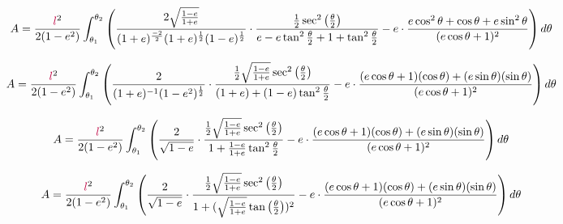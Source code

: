 $$A=\frac{\textcolor{purple}{l}^2}{2(1-\textcolor{black}{e}^2)}\int_{\theta_1}^{\theta_2}\left(
\frac{2\sqrt{\frac{1-\textcolor{black}{e}}{1+\textcolor{black}{e}}}}{(1+\textcolor{black}{e})^{\frac{-2}{2}}(1+\textcolor{black}{e})^{\frac{1}{2}}(1-\textcolor{black}{e})^{\frac{1}{2}}}\cdot
\frac{\frac{1}{2}\sec^2{\left(\frac{\theta}{2}\right)}}{\textcolor{black}{e}-\textcolor{black}{e}\tan^2{\frac{\theta}{2}}+1+\tan^2{\frac{\theta}{2}}}
-\textcolor{black}{e}\cdot\frac{\textcolor{black}{e}\cos^2{\theta}+\cos{\theta}+\textcolor{black}{e}\sin^2{\theta}}{(\textcolor{black}{e}\cos{\theta}+1)^2}\right)d\theta$$

$$A=\frac{\textcolor{purple}{l}^2}{2(1-\textcolor{black}{e}^2)}\int_{\theta_1}^{\theta_2}\left(
\frac{2}{(1+\textcolor{black}{e})^{-1}(1-\textcolor{black}{e}^2)^{\frac{1}{2}}}\cdot
\frac{\frac{1}{2}\sqrt{\frac{1-\textcolor{black}{e}}{1+\textcolor{black}{e}}}\sec^2{\left(\frac{\theta}{2}\right)}}{(1+\textcolor{black}{e})+(1-\textcolor{black}{e})\tan^2{\frac{\theta}{2}}}
-\textcolor{black}{e}\cdot\frac{(\textcolor{black}{e}\cos{\theta}+1)(\cos{\theta})+(\textcolor{black}{e}\sin{\theta})(\sin{\theta})}{(\textcolor{black}{e}\cos{\theta}+1)^2}\right)d\theta$$

$$A=\frac{\textcolor{purple}{l}^2}{2(1-\textcolor{black}{e}^2)}\int_{\theta_1}^{\theta_2}\left(
\frac{2}{\sqrt{1-\textcolor{black}{e}}}\cdot
\frac{\frac{1}{2}\sqrt{\frac{1-\textcolor{black}{e}}{1+\textcolor{black}{e}}}\sec^2{\left(\frac{\theta}{2}\right)}}{1+\frac{1-\textcolor{black}{e}}{1+\textcolor{black}{e}}\tan^2{\frac{\theta}{2}}}
-\textcolor{black}{e}\cdot\frac{(\textcolor{black}{e}\cos{\theta}+1)(\cos{\theta})+(\textcolor{black}{e}\sin{\theta})(\sin{\theta})}{(\textcolor{black}{e}\cos{\theta}+1)^2}\right)d\theta$$

$$A=\frac{\textcolor{purple}{l}^2}{2(1-\textcolor{black}{e}^2)}\int_{\theta_1}^{\theta_2}\left(
\frac{2}{\sqrt{1-\textcolor{black}{e}}}\cdot
\frac{\frac{1}{2}\sqrt{\frac{1-\textcolor{black}{e}}{1+\textcolor{black}{e}}}\sec^2{\left(\frac{\theta}{2}\right)}}{1+(\sqrt{\frac{1-\textcolor{black}{e}}{1+\textcolor{black}{e}}}\tan{\left(\frac{\theta}{2}\right)})^2}
-\textcolor{black}{e}\cdot\frac{(\textcolor{black}{e}\cos{\theta}+1)(\cos{\theta})+(\textcolor{black}{e}\sin{\theta})(\sin{\theta})}{(\textcolor{black}{e}\cos{\theta}+1)^2}\right)d\theta$$

